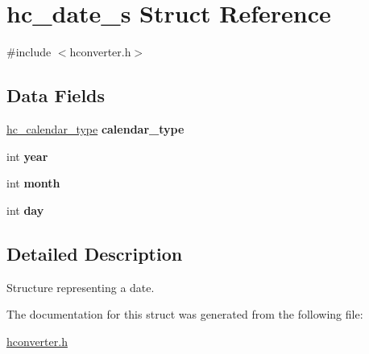 \hypertarget{structhc__date__s}{}\section{hc\+\_\+date\+\_\+s Struct Reference}
\label{structhc__date__s}


{\ttfamily \#include $<$hconverter.\+h$>$}

\subsection*{Data Fields}
\begin{DoxyCompactItemize}
\item 
\hypertarget{structhc__date__s_a5f44e37fd2da2775e5dd4368767f326f}{}\hyperlink{hconverter_8h_acd248779dfe6530e8dcdfe11cd2d107f}{hc\+\_\+calendar\+\_\+type} {\bfseries calendar\+\_\+type}\label{structhc__date__s_a5f44e37fd2da2775e5dd4368767f326f}

\item 
\hypertarget{structhc__date__s_ac5bc622240dcf8ef198f2b90c4d9e88f}{}int {\bfseries year}\label{structhc__date__s_ac5bc622240dcf8ef198f2b90c4d9e88f}

\item 
\hypertarget{structhc__date__s_a8bd01809fcec13254793338b36b750f8}{}int {\bfseries month}\label{structhc__date__s_a8bd01809fcec13254793338b36b750f8}

\item 
\hypertarget{structhc__date__s_aea00c0c0ab22bd3977f65d725b6467b8}{}int {\bfseries day}\label{structhc__date__s_aea00c0c0ab22bd3977f65d725b6467b8}

\end{DoxyCompactItemize}


\subsection{Detailed Description}
Structure representing a date. 

The documentation for this struct was generated from the following file\+:\begin{DoxyCompactItemize}
\item 
\hyperlink{hconverter_8h}{hconverter.\+h}\end{DoxyCompactItemize}
